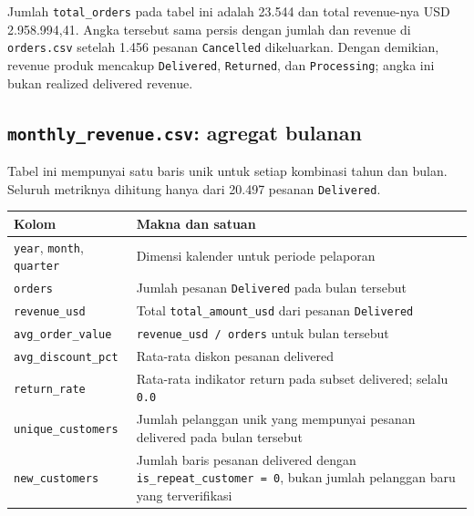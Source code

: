 \documentclass[
  indonesian,
  letterpaper,
  DIV=11,
  numbers=noendperiod]{scrreprt}
\newcounter{none} %
\begin{document}
Jumlah \texttt{total\_orders} pada tabel ini adalah 23.544 dan total
revenue-nya USD 2.958.994,41. Angka tersebut sama persis dengan jumlah
dan revenue di \texttt{orders.csv} setelah 1.456 pesanan
\texttt{Cancelled} dikeluarkan. Dengan demikian, revenue produk mencakup
\texttt{Delivered}, \texttt{Returned}, dan \texttt{Processing}; angka
ini bukan realized delivered revenue.

\subsection*{\texorpdfstring{\texttt{monthly\_revenue.csv}: agregat
bulanan}{monthly\_revenue.csv: agregat bulanan}}\label{monthly_revenue.csv-agregat-bulanan}

Tabel ini mempunyai satu baris unik untuk setiap kombinasi tahun dan
bulan. Seluruh metriknya dihitung hanya dari 20.497 pesanan
\texttt{Delivered}.

{\def\LTcaptype{none} %
\begin{longtable}[]{@{}
  >{\raggedright\arraybackslash}p{}
  >{\raggedright\arraybackslash}p{}@{}}
\toprule\noalign{}
\begin{minipage}[b]{\linewidth}\raggedright
Kolom
\end{minipage} & \begin{minipage}[b]{\linewidth}\raggedright
Makna dan satuan
\end{minipage} \\
\midrule\noalign{}
\endhead
\bottomrule\noalign{}
\endlastfoot
\texttt{year}, \texttt{month}, \texttt{quarter} & Dimensi kalender untuk
periode pelaporan \\
\texttt{orders} & Jumlah pesanan \texttt{Delivered} pada bulan
tersebut \\
\texttt{revenue\_usd} & Total \texttt{total\_amount\_usd} dari pesanan
\texttt{Delivered} \\
\texttt{avg\_order\_value} & \texttt{revenue\_usd\ /\ orders} untuk
bulan tersebut \\
\texttt{avg\_discount\_pct} & Rata-rata diskon pesanan delivered \\
\texttt{return\_rate} & Rata-rata indikator return pada subset
delivered; selalu \texttt{0.0} \\
\texttt{unique\_customers} & Jumlah pelanggan unik yang mempunyai
pesanan delivered pada bulan tersebut \\
\texttt{new\_customers} & Jumlah baris pesanan delivered dengan
\texttt{is\_repeat\_customer\ =\ 0}, bukan jumlah pelanggan baru yang
terverifikasi \\
\end{longtable}
}
\end{document}
